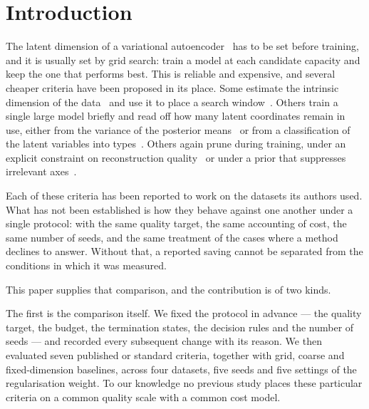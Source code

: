 \documentclass[make,article,submit,pdftex,moreauthors]{Definitions/mdpi}
\begin{document}

\section{Introduction}\label{sec:intro}

The latent dimension of a variational autoencoder~\cite{kingma2014vae} has
to be set before training, and it is usually set by grid search: train a
model at each candidate capacity and keep the one that performs best. This
is reliable and expensive, and several cheaper criteria have been proposed
in its place. Some estimate the intrinsic dimension of the
data~\cite{facco2017twonn,levina2005mle} and use it to place a search
window~\cite{bonheme2022fondue}. Others train a single large model briefly
and read off how many latent coordinates remain in use, either from the
variance of the posterior means~\cite{burda2016iwae} or from a
classification of the latent variables into
types~\cite{bonheme2023active}. Others again prune during training, under
an explicit constraint on reconstruction quality~\cite{deboom2020geco} or
under a prior that suppresses irrelevant axes~\cite{saha2025ardvae}.

Each of these criteria has been reported to work on the datasets its
authors used. What has not been established is how they behave against one
another under a single protocol: with the same quality target, the same
accounting of cost, the same number of seeds, and the same treatment of
the cases where a method declines to answer. Without that, a reported
saving cannot be separated from the conditions in which it was measured.

This paper supplies that comparison, and the contribution is of two kinds.

The first is the comparison itself. We fixed the protocol in advance --- the
quality target, the budget, the termination states, the decision rules and
the number of seeds --- and recorded every subsequent change with its
reason. We then evaluated seven published or standard criteria, together
with grid, coarse and fixed-dimension baselines, across four datasets,
five seeds and five settings of the regularisation weight. To our
knowledge no previous study places these particular criteria on a common
quality scale with a common cost model.
\end{document}
